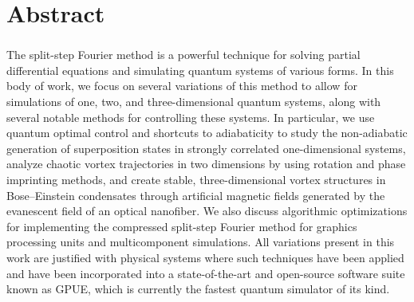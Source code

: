 \chapter*{Abstract} 
\subsection*{\thesistitle}

The split-step Fourier method is a powerful technique for solving partial differential equations and simulating quantum systems of various forms.
In this body of work, we focus on several variations of this method to allow for simulations of one, two, and three-dimensional quantum systems, along with several notable methods for controlling these systems.
In particular, we use quantum optimal control and shortcuts to adiabaticity to study the non-adiabatic generation of superposition states in strongly correlated one-dimensional systems, analyze chaotic vortex trajectories in two dimensions by using rotation and phase imprinting methods, and create stable, three-dimensional vortex structures in Bose--Einstein condensates through artificial magnetic fields generated by the evanescent field of an optical nanofiber.
We also discuss algorithmic optimizations for implementing the compressed split-step Fourier method for graphics processing units and multicomponent simulations.
All variations present in this work are justified with physical systems where such techniques have been applied and have been incorporated into a state-of-the-art and open-source software suite known as GPUE, which is currently the fastest quantum simulator of its kind.
